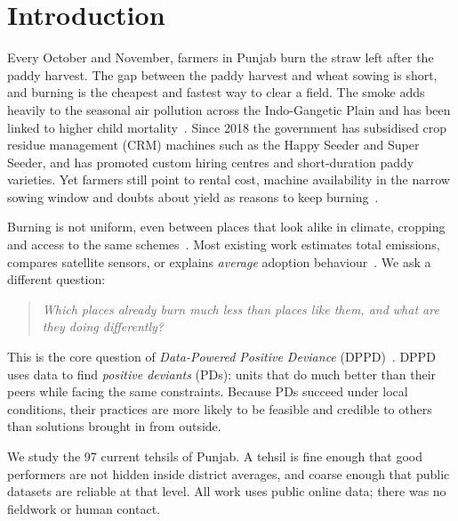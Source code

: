 \documentclass[sigconf,nonacm]{acmart}
\begin{document}

\maketitle

\section{Introduction}

Every October and November, farmers in Punjab burn the straw left after the paddy harvest. The gap between the paddy harvest and wheat sowing is short, and burning is the cheapest and fastest way to clear a field. The smoke adds heavily to the seasonal air pollution across the Indo-Gangetic Plain and has been linked to higher child mortality~\cite{dipoppa2024bureaucrat}. Since 2018 the government has subsidised crop residue management (CRM) machines such as the Happy Seeder and Super Seeder, and has promoted custom hiring centres and short-duration paddy varieties. Yet farmers still point to rental cost, machine availability in the narrow sowing window and doubts about yield as reasons to keep burning~\cite{kurinji2024averse,rgics2024crm}.

Burning is not uniform, even between places that look alike in climate, cropping and access to the same schemes~\cite{ceew2025end}. Most existing work estimates total emissions, compares satellite sensors, or explains \emph{average} adoption behaviour~\cite{vadrevu2018viirs,walker2022detecting}. We ask a different question:

\begin{quote}
\emph{Which places already burn much less than places like them, and what are they doing differently?}
\end{quote}

This is the core question of \emph{Data-Powered Positive Deviance} (DPPD)~\cite{albanna2022dppd,dppd2021handbook}. DPPD uses data to find \emph{positive deviants} (PDs): units that do much better than their peers while facing the same constraints. Because PDs succeed under local conditions, their practices are more likely to be feasible and credible to others than solutions brought in from outside.

We study the 97 current tehsils of Punjab. A tehsil is fine enough that good performers are not hidden inside district averages, and coarse enough that public datasets are reliable at that level. All work uses public online data; there was no fieldwork or human contact.
\end{document}
